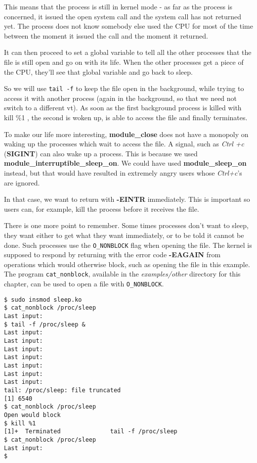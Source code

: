 \documentclass[10pt, oneside]{book}
\begin{document}
This means that the process is still in kernel mode - as far as the process is concerned, it issued the open system call and the system call has not returned yet.
The process does not know somebody else used the CPU for most of the time between the moment it issued the call and the moment it returned.

It can then proceed to set a global variable to tell all the other processes that the file is still open and go on with its life.
When the other processes get a piece of the CPU, they'll see that global variable and go back to sleep.

So we will use \verb|tail -f| to keep the file open in the background, while trying to access it with another process (again in the background, so that we need not switch to a different vt).
As soon as the first background process is killed with kill \%1 , the second is woken up, is able to access the file and finally terminates.

To make our life more interesting, \textbf{module\_close} does not have a monopoly on waking up the processes which wait to access the file.
A signal, such as \emph{Ctrl +c} (\textbf{SIGINT}) can also wake up a process. This is because we used \textbf{module\_interruptible\_sleep\_on}.
We could have used \textbf{module\_sleep\_on} instead, but that would have resulted in extremely angry users whose \emph{Ctrl+c}'s are ignored.

In that case, we want to return with \textbf{-EINTR} immediately. This is important so users can, for example, kill the process before it receives the file.

There is one more point to remember. Some times processes don't want to sleep, they want either to get what they want immediately, or to be told it cannot be done.
Such processes use the \verb|O_NONBLOCK| flag when opening the file.
The kernel is supposed to respond by returning with the error code \textbf{-EAGAIN} from operations which would otherwise block, such as opening the file in this example. The program \verb|cat_nonblock|, available in the \textit{examples/other} directory for this chapter, can be used to open a file with \verb|O_NONBLOCK|.

\begin{verbatim}
$ sudo insmod sleep.ko
$ cat_nonblock /proc/sleep
Last input:
$ tail -f /proc/sleep &
Last input:
Last input:
Last input:
Last input:
Last input:
Last input:
Last input:
tail: /proc/sleep: file truncated
[1] 6540
$ cat_nonblock /proc/sleep
Open would block
$ kill %1
[1]+  Terminated              tail -f /proc/sleep
$ cat_nonblock /proc/sleep
Last input:
$
\end{verbatim}
\end{document}
